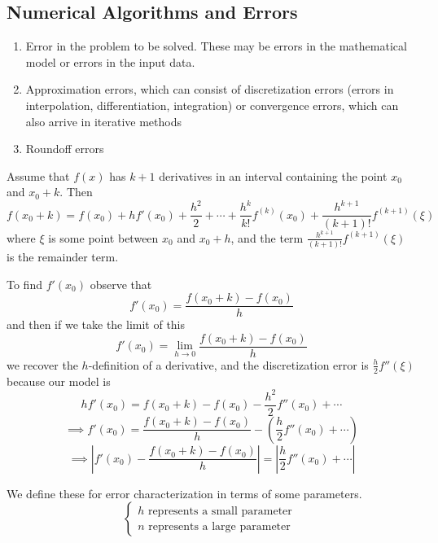 \documentclass[12pt]{scrartcl}
\begin{document}
\subsection{Numerical Algorithms and Errors}

\begin{definition}

  \hfill

  \begin{enumerate}
    \item Error in the problem to be solved. These may be errors in the mathematical model or errors in the input data.
    \item Approximation errors, which can consist of discretization errors (errors in interpolation, differentiation, integration) or 
    convergence errors, which can also arrive in iterative methods
    \item Roundoff errors
  \end{enumerate}
\end{definition}

\begin{definition}
  Assume that $f(x)$ has $k+1$ derivatives in an interval containing the point $x_0$ and 
  $x_0 + k$. Then 
  \[f(x_0 + k) = f(x_0) + hf'(x_0)+ \frac{h^2}{2} + \cdots + \frac{h^k}{k!}f^{(k)}(x_0) + \frac{h^{k+1}}{(k+1)!}f^{(k+1)}(\xi)\]
  where $\xi$ is some point between $x_0$ and $x_0 + h$, and the term $\frac{h^{k+1}}{(k+1)!}f^{(k+1)}(\xi)$ is the remainder term.
\end{definition}

\begin{note}
  To find $f'(x_0)$ observe that 
  \[f'(x_0) = \frac{f(x_0 + k) - f(x_0)}{h}\] 
  and then if we take the limit of this 
  \[f'(x_0) = \lim_{h\to 0} \frac{f(x_0 + k) - f(x_0)}{h}\]
  we recover the $h$-definition of a derivative, and the discretization error is 
  $\frac{h}{2}f''(\xi)$ because our model is 
  \[hf'(x_0) = f(x_0 + k) - f(x_0) - \frac{h^2}{2}f''(x_0) + \cdots\]
  \[\implies f'(x_0) = \frac{f(x_0 + k) - f(x_0)}{h} - \left(\frac{h}{2}f''(x_0) + \cdots\right)\]
  \[\implies \left| f'(x_0) - \frac{f(x_0 + k) - f(x_0)}{h} \right| = \left| \frac{h}{2}f''(x_0) + \cdots \right|\]
\end{note}

\begin{definition}
  We define these for error characterization in terms of some parameters.
  \[\begin{cases}
    h \text{ represents a small parameter }\\
    n \text{ represents a large parameter }
  \end{cases}\]
\end{definition}
\end{document}
